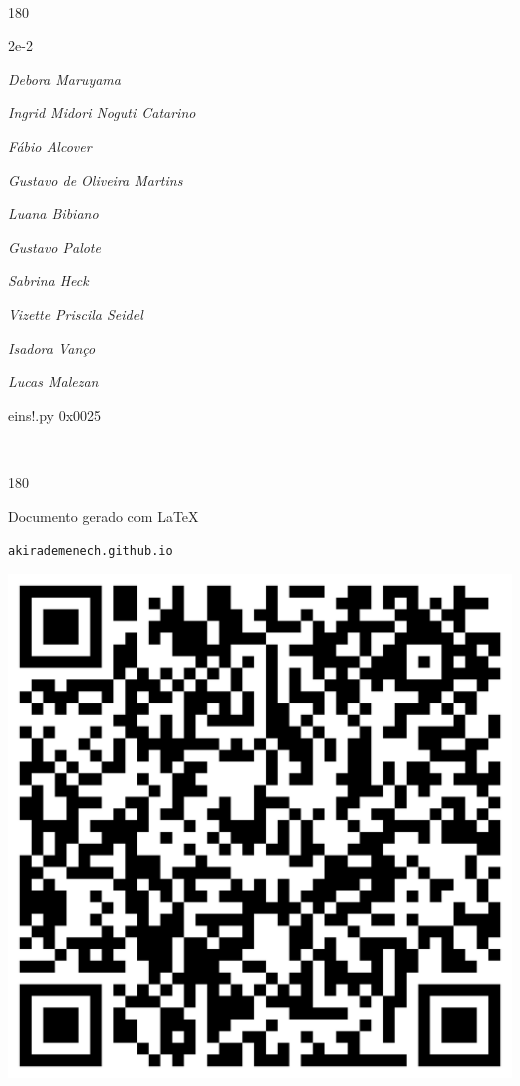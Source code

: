 \documentclass[12pt]{article}
\begin{document}
	\ 
	\vfill
	\begin{turn}{180}	
		\begin{minipage}{\textwidth}
		  	\ttfamily %
			\centering
			{\Huge 2e-2}
		  
			\hfill
		  
			

\textit{\small Debora Maruyama}

\textit{\small Ingrid Midori Noguti Catarino}

\textit{\small Fábio Alcover}

\textit{\small Gustavo de Oliveira Martins}

\textit{\small Luana Bibiano}

\textit{\small Gustavo Palote}

\textit{\small Sabrina Heck}

\textit{\small Vizette Priscila Seidel}

\textit{\small Isadora Vanço}

\textit{\small Lucas Malezan}

\bigskip

eins!.py
0x0025


		\end{minipage}	
	\end{turn}
	\vfill
	\

\pagebreak

	\begin{turn}{180}	
		\begin{minipage}{\textwidth}		  
		  Documento gerado com \LaTeX			
		  
		  \texttt{akirademenech.github.io}

		  \includegraphics[height=0.3\textheight]{2e-2.pdf}

		\end{minipage}	
	\end{turn}  
		  
\end{document}
